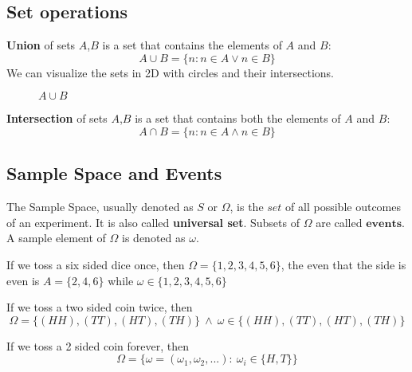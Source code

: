 \subsection*{Set operations}
\textbf{Union} of sets $A$,$B$ is a set that contains the elements of $A$ and $B$:
$$A \cup B = \{n:n \in A  \lor  n  \in B\}$$
We can visualize the sets in 2D with circles and their intersections.  
\begin{figure}[!h]
    \centering
    
    \caption{$A \cup B$}
\end{figure}











\textbf{Intersection} of sets $A$,$B$ is a set that contains both the elements of $A$ and $B$:
$$A \cap B = \{n:n \in A  \land  n  \in B\}$$

\par






\subsection*{Sample Space and Events}
The Sample Space, usually denoted as $S$ or $\Omega$, is the $\textit{set}$ of all possible outcomes of an experiment. It is also called  \textbf{universal set}. Subsets of $\Omega$ are called $\textbf{events}$. A sample element of $\Omega$ is denoted as $\omega$.

\begin{example}
    If we toss a six sided dice once, then $\Omega = \{1,2,3,4,5,6\}$, the even that the side is even is $A= \{2,4,6\}$ while $\omega \in \{1,2,3,4,5,6\}$
\end{example}

\begin{example}
    If we toss a two sided coin twice, then $$\Omega = \{(HH),(TT),(HT),(TH)\} \ \land \ \omega \in \{(HH),(TT),(HT),(TH)\}$$
\end{example}
\begin{example}
    If we toss a 2 sided coin forever, then $$\Omega = \{\omega= (\omega_1,\omega_2,...): \ \omega_i \in \{H,T\} \}$$
\end{example}

